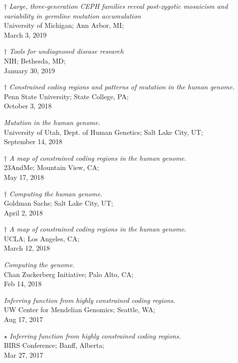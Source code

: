 \documentclass[margin,line]{cv}
\begin{document}
\begin{resume}
    $\dagger$ \textit{Large, three-generation CEPH families reveal post-zygotic mosaicism and variability in germline mutation accumulation} \\
    University of Michigan; Ann Arbor, MI; \\
    March 3, 2019

    $\dagger$ \textit{Tools for undiagnosed disease research} \\
    NIH; Bethesda, MD; \\
    January 30, 2019

    $\dagger$ \textit{Constrained coding regions and patterns of mutation in the human genome.
} \\
    Penn State University; State College, PA; \\
    October 3, 2018

    \textit{Mutation in the human genome.
} \\
    University of Utah, Dept. of Human Genetics; Salt Lake City, UT; \\
    September 14, 2018

    $\dagger$ \textit{A map of constrained coding regions in the human genome.
} \\
    23AndMe; Mountain View, CA; \\
    May 17, 2018

    $\dagger$ \textit{Computing the human genome.
} \\
    Goldman Sachs; Salt Lake City, UT; \\
    April 2, 2018

    $\dagger$ \textit{A map of constrained coding regions in the human genome.
} \\
    UCLA; Los Angeles, CA; \\
    March 12, 2018

    \textit{Computing the genome.} \\
    Chan Zuckerberg Initiative; Palo Alto, CA; \\
    Feb 14, 2018

    \textit{Inferring function from highly constrained coding regions.} \\
    UW Center for Mendelian Genomics; Seattle, WA; \\
    Aug 17, 2017

    $\star$ \textit{Inferring function from highly constrained coding regions.} \\
    BIRS Conference; Banff, Alberta; \\
    Mar 27, 2017


\end{resume}
\end{document}

